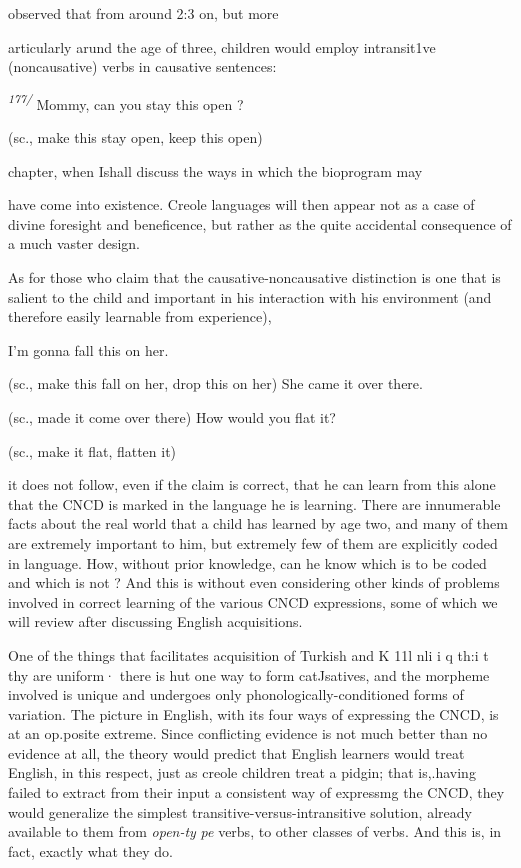 \citet{Bowerman1974} observed that from around 2:3 on, but more

articularly arund the age of three, children would employ intransi\-t1ve (noncausative) verbs in causative sentences:

\textit{\textsuperscript{1}}\textit{\textsuperscript{7}}\textit{\textsuperscript{7}}\textit{\textsuperscript{/ }}Mommy, can you stay this open ?

(sc., make this stay open, keep this open)

chapter, when Ishall discuss the ways in which the bioprogram may

have come into existence. Creole languages will then appear not as a case of divine foresight and beneficence, but rather as the quite acci\-dental consequence of a much vaster design.

As for those who claim that the causative-noncausative distinc\-tion is one that is salient to the child and important in his interaction with his environment (and therefore easily learnable from experience),

\ea\label{ex:78}

\glt
\z

\ea\label{ex:79}

\glt
\z

\ea\label{ex:80}

\glt
\z

I'm gonna fall this on her.

(sc., make this fall on her, drop this on her) She came it over there.

(sc., made it come over there) How would you flat it?

(sc., make it flat, flatten it)

it does not follow, even if the claim is correct, that he can learn from this alone that the CNCD is marked in the language he is learning. There are innumerable facts about the real world that a child has learned by age two, and many of them are extremely important to him, but extremely few of them are explicitly coded in language. How, without prior knowledge, can he know which is to be coded and which is not ? And this is without even considering other kinds of problems involved in correct learning of the various CNCD expressions, some of which we will review after discussing English acquisitions.

One of the things that facilitates acquisition of Turkish and K 11l nli i q th:i t th{\textquotedbl}y are uniform· there is hut one way to form catJsatives, and the morpheme involved is unique and undergoes only phonologically-conditioned forms of variation. The picture in English, with its four ways of expressing the CNCD, is at an op.posite extreme. Since conflicting evidence is not much better than no evidence at all, the theory would predict that English learners would treat En\-glish, in this respect, just as creole children treat a pidgin; that is,.having failed to extract from their input a consistent way of expressmg the CNCD, they would generalize the simplest transitive-versus-intransitive solution, already available to them from \textit{open-}\textit{t}\textit{y} \textit{pe }verbs, to other classes of verbs. And this is, in fact, exactly what they do.

